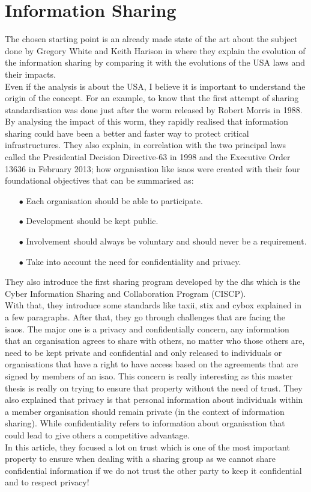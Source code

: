 \documentclass{eplmastersthesis}
\begin{document}
\section{Information Sharing}
The chosen starting point is an already made state of the art about the subject done by Gregory White and Keith Harison in \cite{white2017state} where they explain the evolution of the information sharing by comparing it with the evolutions of the USA laws and their impacts.\\
Even if the analysis is about the USA, I believe it is important to understand the origin of the concept. For an example, to know that the first attempt of sharing standardisation was done just after the worm released by Robert Morris in 1988.\\
By analysing the impact of this worm, they rapidly realised that information sharing could have been a better and faster way to protect critical infrastructures. They also explain, in correlation with the two principal laws called the Presidential Decision Directive-63 in 1998 and the Executive Order 13636 in February 2013; how organisation like \gls{isao}s were created with their four foundational objectives that can be summarised as:
\begin{itemize}
\item[$\bullet$] Each organisation should be able to participate.
\item[$\bullet$] Development should be kept public.
\item[$\bullet$] Involvement should always be voluntary and should never be a requirement.
\item[$\bullet$] Take into account the need for confidentiality and privacy.
\end{itemize}
They also introduce the first sharing program developed by the \gls{dhs} which is the Cyber Information Sharing and Collaboration Program (CISCP).\\
With that, they introduce some standards like \gls{taxii}, \gls{stix} and \gls{cybox} explained in a few paragraphs. After that, they go through challenges that are facing the \gls{isao}s. The major one is a privacy and confidentially concern, any information that an organisation agrees to share with others, no matter who those others are, need to be kept private and confidential and only released to individuals or organisations that have a right to have access based on the agreements that are signed by members of an \gls{isao}. This concern is really interesting as this master thesis is really on trying to ensure that property without the need of trust. They also explained that privacy is that personal information about individuals within a member organisation should remain private (in the context of information sharing).
While confidentiality refers to information about organisation that could lead to give others a competitive advantage.\\
In this article, they focused a lot on trust which is one of the most important property to ensure when dealing with a sharing group as we cannot share confidential information if we do not trust the other party to keep it confidential and to respect privacy! \\
\end{document}
